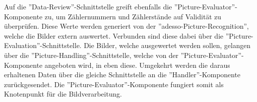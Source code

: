 Auf die ''Data-Review''-Schnittstelle greift ebenfalls die ''Picture-Evaluator''-Komponente zu, um Zählernummern und Zählerstände auf Validität zu überprüfen. Diese Werte werden generiert von der ''adesso-Picture-Recognition'', welche die Bilder extern auswertet. Verbunden sind diese dabei über die ''Picture-Evaluation''-Schnittstelle. Die Bilder, welche ausgewertet werden sollen, gelangen über die ''Picture-Handling''-Schnittstelle, welche von der ''Picture-Evaluator''-Komponente angeboten wird, in eben diese. Umgekehrt werden die daraus erhaltenen Daten über die gleiche Schnittstelle an die ''Handler''-Komponente zurückgesendet. Die ''Picture-Evaluator''-Komponente fungiert somit als Knotenpunkt für die Bildverarbeitung. 

